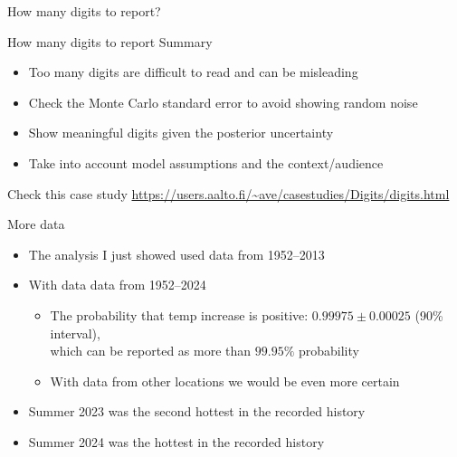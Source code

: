 \documentclass[english,t]{beamer}
\begin{document}
\begin{frame}{How many digits to report?}
\end{frame}


\begin{frame}{How many digits to report Summary}

\vspace{-0.5\baselineskip}  
  \begin{itemize}
    \item Too many digits are difficult to read and can be misleading
    \item Check the Monte Carlo standard error to avoid showing random noise
    \item Show meaningful digits given the posterior uncertainty
    \item Take into account model assumptions and the context/audience
  \end{itemize}
Check this case study \url{https://users.aalto.fi/~ave/casestudies/Digits/digits.html}
\end{frame}


\begin{frame}{More data}

  \vspace{-0.75\baselineskip}
  \begin{itemize}
  \item<1-> The analysis I just showed used data from 1952--2013
  \item<2-> With data data from 1952--2024
    \begin{itemize}
    \item The probability that temp increase is positive:
      $0.99975 \pm 0.00025$ (90\% interval),\\ which can be reported as more than
      $99.95\%$ probability
    \item With data from other locations we would be even more certain
    \end{itemize}
  \item<3-> Summer 2023 was the second hottest in the recorded history
  \item<3-> Summer 2024 was the hottest in the recorded history
  \end{itemize}
  \vspace{-0.5\baselineskip}
  
\end{frame}
\end{document}
